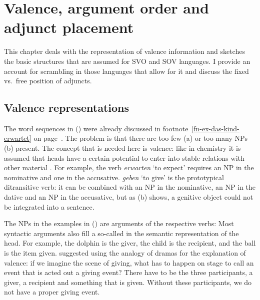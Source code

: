 \chapter{Valence, argument order and adjunct placement}
\label{chap-valence}


This chapter deals with the representation of valence information and sketches the basic structures that
are assumed for SVO and SOV languages. I provide an account for scrambling in those languages that
allow for it and discuss the fixed vs.\ free position of adjuncts.

\section{Valence representations}
\label{sec-valence}

The word sequences in () were already discussed in footnote~\ref{fn-ex-das-kind-erwartet} on
page~\pageref{fn-ex-das-kind-erwartet}.
\eal
{}
\zl
The problem is that there are too few (a) or too many NPs (b) present. The concept
that is needed here is valence: like in chemistry it is assumed that heads have a certain potential
to enter into stable relations with other material \citep[]{Tesniere2015a-u}. For example, the verb \emph{erwarten} `to
expect' requires an NP in the nominative and one in the accusative. \emph{geben} `to give' is the
prototypical ditransitive verb: it can be combined with an NP in the nominative, an NP in the dative
and an NP in the accusative, but as (b) shows, a genitive object could not be integrated into
a sentence. 

The NPs in the examples in () are arguments of the respective verbs:
\eal
{}
\zl
Most syntactic arguments also fill a so-called  in the semantic representation of the
head. For example, the dolphin is the giver, the child is the recipient, and the ball is the item
given. \citet[Chapter~48]{Tesniere2015a-u} suggested using the analogy of dramas for the explanation of valence: if we
imagine the scene of giving, what has to happen on stage to call an event that is acted out a giving
event? There have to be the three participants, a giver, a recipient and something that is
given. Without these participants, we do not have a proper giving event. 

